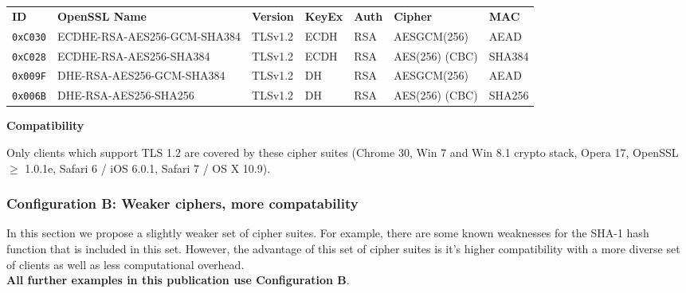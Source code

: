 %



\begin{center}

\begin{tabular}{lllllll}
\toprule
\textbf{ID}   & \textbf{OpenSSL Name}       & \textbf{Version} & \textbf{KeyEx} & \textbf{Auth} & \textbf{Cipher} & \textbf{MAC}\\\cmidrule(lr){1-7}
\verb|0xC030| & ECDHE-RSA-AES256-GCM-SHA384 & TLSv1.2          & ECDH           &  RSA          & AESGCM(256)     & AEAD         \\
\verb|0xC028| & ECDHE-RSA-AES256-SHA384     & TLSv1.2          & ECDH           &  RSA          & AES(256) (CBC)  & SHA384       \\
\verb|0x009F| & DHE-RSA-AES256-GCM-SHA384   & TLSv1.2          & DH             &  RSA          & AESGCM(256)     & AEAD         \\
\verb|0x006B| & DHE-RSA-AES256-SHA256       & TLSv1.2          & DH             &  RSA          & AES(256) (CBC)  & SHA256       \\
\bottomrule
\end{tabular}
\end{center}


\textbf{Compatibility}

Only clients which support TLS 1.2 are covered by these cipher suites (Chrome 30,
Win 7 and Win 8.1 crypto stack, Opera 17, OpenSSL $\ge$ 1.0.1e, Safari 6 / iOS
6.0.1, Safari 7 / OS X 10.9).



\subsubsection{Configuration B: Weaker ciphers, more compatability}

In this section we propose a slightly weaker set of cipher suites. 
For example, there are some known weaknesses for the SHA-1 hash function that
is included in this set. However, the advantage of this set of cipher suites 
is it's higher compatibility with a more diverse set of clients as well as 
less computational overhead.\\ 

\textbf{All further examples in this publication use Configuration B}.\\

